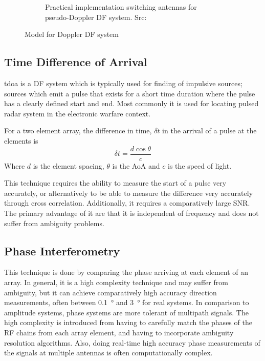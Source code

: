 \begin{figure}
\begin{subfigure}[b]{0.48\textwidth}
    \caption{Practical implementation switching antennas for pseudo-Doppler DF system. Src: \cite{jenkins1991smallaperture}}
  \end{subfigure}
  \caption{Model for Doppler DF system}
  \label{fig:lit-review-doppler-switching}
\end{figure}


\subsection{Time Difference of Arrival}
\gls{tdoa} is a DF system which is typically used for finding of impulsive sources; sources which emit a pulse that exists for a short time duration where the pulse has a clearly defined start and end. Most commonly it is used for locating pulsed radar system in the electronic warfare context.

For a two element array, the difference in time, \(\delta t\) in the arrival of a pulse at the elements is
\begin{equation}
  \delta t = \frac{d \cos \theta}{c}
\end{equation}
Where \(d\) is the element spacing, \(\theta\) is the AoA and \(c\) is the speed of light.

This technique requires the ability to measure the start of a pulse very accurately, or alternatively to be able to measure the difference very accurately through cross correlation. Additionally, it requires a comparatively large SNR. The primary advantage of it are that it is independent of frequency and does not suffer from ambiguity problems\cite{jenkins1991smallaperture}.

\subsection{Phase Interferometry}
This technique is done by comparing the phase arriving at each element of an array.
In general, it is a high complexity technique and may suffer from ambiguity, but it can achieve comparatively high accuracy direction measurements, often between \SI{0.1}{\degree} and \SI{3}{\degree} for real systems\cite{center2012electronic}.
In comparison to amplitude systems, phase systems are more tolerant of multipath signals. 
The high complexity is introduced from having to carefully match the phases of the RF chains from each array element, and having to incorporate ambiguity resolution algorithms. Also, doing real-time high accuracy phase measurements of the signals at multiple antennas is often computationally complex. 

